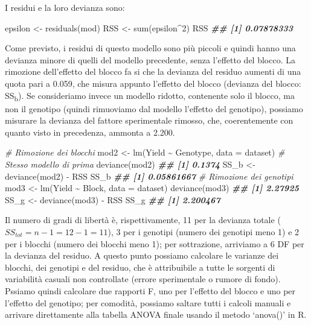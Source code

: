 \documentclass[
  12pt,
]{book}
\newenvironment{Shaded}{\begin{snugshade}}{\end{snugshade}}
\newcommand{\AttributeTok}[1]{\textcolor[rgb]{0.77,0.63,0.00}{#1}}
\newcommand{\CommentTok}[1]{\textcolor[rgb]{0.56,0.35,0.01}{\textit{#1}}}
\newcommand{\DecValTok}[1]{\textcolor[rgb]{0.00,0.00,0.81}{#1}}
\newcommand{\DocumentationTok}[1]{\textcolor[rgb]{0.56,0.35,0.01}{\textbf{\textit{#1}}}}
\newcommand{\FunctionTok}[1]{\textcolor[rgb]{0.00,0.00,0.00}{#1}}
\newcommand{\NormalTok}[1]{#1}
\newcommand{\OtherTok}[1]{\textcolor[rgb]{0.56,0.35,0.01}{#1}}
\newcommand{\SpecialCharTok}[1]{\textcolor[rgb]{0.00,0.00,0.00}{#1}}
\begin{document}
I residui e la loro devianza sono:

\begin{Shaded}
\begin{Highlighting}[]
\NormalTok{epsilon }\OtherTok{\textless{}{-}} \FunctionTok{residuals}\NormalTok{(mod)}
\NormalTok{RSS }\OtherTok{\textless{}{-}} \FunctionTok{sum}\NormalTok{(epsilon}\SpecialCharTok{\^{}}\DecValTok{2}\NormalTok{)}
\NormalTok{RSS}
\DocumentationTok{\#\# [1] 0.07878333}
\end{Highlighting}
\end{Shaded}

Come previsto, i residui di questo modello sono più piccoli e quindi hanno una devianza minore di quelli del modello precedente, senza l'effetto del blocco. La rimozione dell'effetto del blocco fa si che la devianza del residuo aumenti di una quota pari a 0.059, che misura appunto l'effetto del blocco (devianza del blocco: SS\textsubscript{b}). Se consideriamo invece un modello ridotto, contenente solo il blocco, ma non il genotipo (quindi rimuoviamo dal modello l'effetto del genotipo), possiamo misurare la devianza del fattore sperimentale rimosso, che, coerentemente con quanto visto in precedenza, ammonta a 2.200.

\begin{Shaded}
\begin{Highlighting}[]
\CommentTok{\# Rimozione dei blocchi}
\NormalTok{mod2 }\OtherTok{\textless{}{-}} \FunctionTok{lm}\NormalTok{(Yield }\SpecialCharTok{\textasciitilde{}}\NormalTok{ Genotype, }\AttributeTok{data =}\NormalTok{ dataset) }\CommentTok{\# Stesso modello di prima}
\FunctionTok{deviance}\NormalTok{(mod2)}
\DocumentationTok{\#\# [1] 0.1374}
\NormalTok{SS\_b }\OtherTok{\textless{}{-}} \FunctionTok{deviance}\NormalTok{(mod2) }\SpecialCharTok{{-}}\NormalTok{ RSS}
\NormalTok{SS\_b}
\DocumentationTok{\#\# [1] 0.05861667}
\CommentTok{\# Rimozione dei genotipi}
\NormalTok{mod3 }\OtherTok{\textless{}{-}} \FunctionTok{lm}\NormalTok{(Yield }\SpecialCharTok{\textasciitilde{}}\NormalTok{ Block, }\AttributeTok{data =}\NormalTok{ dataset)}
\FunctionTok{deviance}\NormalTok{(mod3)}
\DocumentationTok{\#\# [1] 2.27925}
\NormalTok{SS\_g }\OtherTok{\textless{}{-}} \FunctionTok{deviance}\NormalTok{(mod3) }\SpecialCharTok{{-}}\NormalTok{ RSS}
\NormalTok{SS\_g}
\DocumentationTok{\#\# [1] 2.200467}
\end{Highlighting}
\end{Shaded}

Il numero di gradi di libertà è, rispettivamente, 11 per la devianza totale (\(SS_{tot} = n - 1 = 12 - 1 = 11\)), 3 per i genotipi (numero dei genotipi meno 1) e 2 per i blocchi (numero dei blocchi meno 1); per sottrazione, arriviamo a 6 DF per la devianza del residuo. A questo punto possiamo calcolare le varianze dei blocchi, dei genotipi e del residuo, che è attribuibile a tutte le sorgenti di variabilità casuali non controllate (errore sperimentale o rumore di fondo). Pssiamo quindi calcolare due rapporti F, uno per l'effetto del blocco e uno per l'effetto del genotipo; per comodità, possiamo saltare tutti i calcoli manuali e arrivare direttamente alla tabella ANOVA finale usando il metodo `anova()' in R.
\end{document}

